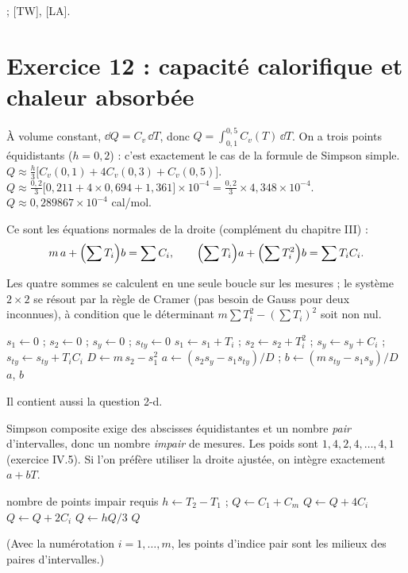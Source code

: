 \Refs {} ; [TW], [LA].

\section{Exercice 12 : capacité calorifique et chaleur absorbée}

\Pourquoi À volume constant, $\dd Q = C_v\,\dd T$, donc
$Q = \int_{0{,}1}^{0{,}5} C_v(T)\,\dd T$. On a trois points équidistants
($h = 0{,}2$) : c'est exactement le cas de la formule de Simpson simple.
\Etapes
{} $Q \approx \frac h3\bigl[C_v(0{,}1) + 4C_v(0{,}3) + C_v(0{,}5)\bigr]$.
 $Q \approx \frac{0{,}2}{3}\bigl[0{,}211 + 4 \times 0{,}694 + 1{,}361\bigr]\times 10^{-4}
         = \frac{0{,}2}{3} \times 4{,}348 \times 10^{-4}$.
 $Q \approx 0{,}289867 \times 10^{-4}$ cal/mol.

Ce sont les équations normales de la droite (complément du chapitre III) :
\[
  m\,a + \Bigl(\sum T_i\Bigr)b = \sum C_i, \qquad
  \Bigl(\sum T_i\Bigr)a + \Bigl(\sum T_i^2\Bigr)b = \sum T_iC_i .
\]

\Pourquoi Les quatre sommes se calculent en une seule boucle sur les mesures ;
le système $2\times 2$ se résout par la règle de Cramer (pas besoin de Gauss
pour deux inconnues), à condition que le déterminant
$m\sum T_i^2 - (\sum T_i)^2$ soit non nul.
\begin{algo}
  \State $s_1 \leftarrow 0$ ; $s_2 \leftarrow 0$ ; $s_y \leftarrow 0$ ; $s_{ty} \leftarrow 0$
    \State $s_1 \leftarrow s_1 + T_i$ ; $s_2 \leftarrow s_2 + T_i^2$ ; $s_y \leftarrow s_y + C_i$ ; $s_{ty} \leftarrow s_{ty} + T_iC_i$
  \EndFor
  \State $D \leftarrow m\,s_2 - s_1^2$
  \State $a \leftarrow (s_2s_y - s_1s_{ty})/D$ ; $b \leftarrow (m\,s_{ty} - s_1s_y)/D$
  \Print $a$, $b$
\end{algo}

 Il contient aussi la question 2-d.

\Pourquoi Simpson composite exige des abscisses équidistantes et un nombre
\emph{pair} d'intervalles, donc un nombre \emph{impair} de mesures. Les poids
sont $1, 4, 2, 4, \dots, 4, 1$ (exercice IV.5). Si l'on préfère utiliser la
droite ajustée, on intègre exactement $a + bT$.
\begin{algo}
   \Print \og nombre de points impair requis \fg{} \Stop \EndIf
  \State $h \leftarrow T_2 - T_1$ ; $Q \leftarrow C_1 + C_m$
     \State $Q \leftarrow Q + 4C_i$ \Else \State $Q \leftarrow Q + 2C_i$ \EndIf
  \EndFor
  \State $Q \leftarrow hQ/3$
  \Print $Q$
\end{algo}
(Avec la numérotation $i = 1, \dots, m$, les points d'indice pair sont les
milieux des paires d'intervalles.)

